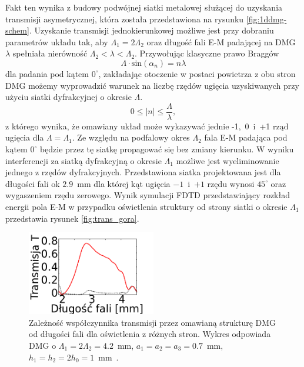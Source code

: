 Fakt ten wynika z budowy podwójnej siatki metalowej służącej do uzyskania transmisji asymetrycznej, która została przedstawiona na rysunku \ref{fig:1ddmg-schem}. Uzyskanie transmisji jednokierunkowej możliwe jest przy dobraniu parametrów układu tak, aby $\Lambda_1 = 2\Lambda_2$ oraz długość fali E-M padającej na DMG  $\lambda$ spełniała nierówność $\Lambda_2<\lambda<\Lambda_2$. Przywołując klasyczne prawo Braggów
\begin{equation}
	\Lambda \cdot \textrm{sin}(\alpha_n) = n \lambda 
\end{equation}
dla padania pod kątem $0^{\circ}$, zakładając otoczenie w postaci powietrza z obu stron DMG możemy wyprowadzić warunek na liczbę rzędów ugięcia uzyskiwanych przy użyciu siatki dyfrakcyjnej o okresie $\Lambda$. 
\begin{equation}
	 0 \le |n| \le \frac { \Lambda }{\lambda},
\end{equation}
z którego wynika, że omawiany układ może wykazywać jednie -1,~0~i~+1 rząd ugięcia dla  $\Lambda=\Lambda_1$. Ze względu na podfalowy okres $\Lambda_2$ fala E-M padająca pod kątem $0^{\circ}$ będzie przez tę siatkę propagować się bez zmiany kierunku.  W wyniku interferencji za siatką dyfrakcyjną o okresie $\Lambda_1$ możliwe jest wyeliminowanie jednego z rzędów dyfrakcyjnych. Przedstawiona siatka projektowana jest dla długości fali ok $2.9$~mm dla której kąt ugięcia $-1$~i~$+1$ rzędu wynosi $45^{\circ}$ oraz wygaszeniem rzędu zerowego. Wynik symulacji FDTD przedstawiający rozkład energii pola E-M w przypadku oświetlenia struktury od strony siatki o okresie $\Lambda_1$ przedstawia rysunek \ref{fig:trans_gora}.

\begin{figure}
	\centering
	\includegraphics[width=0.5\textwidth]{images/thz/opt_lett_spect.png}
	\caption{Zależność współczynnika transmisji przez omawianą strukturę DMG od długości fali dla oświetlenia z różnych stron. Wykres odpowiada DMG o $\Lambda_1= 2 \Lambda_2 = 4.2$~mm, $a_1=a_2=a_3=0.7$~mm, $h_1=h_2=2 h_0=1$~mm~\cite{Stolarek:13}.}
	\label{fig:trans_freq}
\end{figure}

